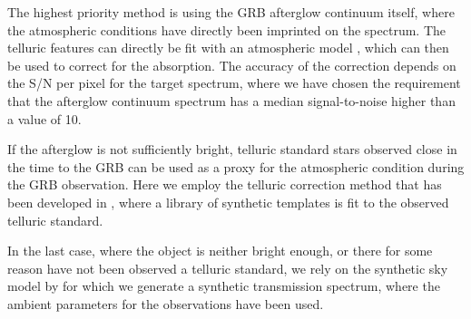 \documentclass{aa}    %
\begin{document}
The highest priority method is using the GRB afterglow continuum itself, where
the atmospheric conditions have directly been imprinted on the spectrum. The
telluric features can directly be fit with an atmospheric model
\citep{Smette2015, Kausch2015}, which can then be used to correct for the
absorption. The accuracy of the correction depends on the S/N per pixel for the
target spectrum, where we have chosen the requirement that the afterglow
continuum spectrum has a median signal-to-noise higher than a value of 10.

If the afterglow is not sufficiently bright, telluric standard stars observed
close in the time to the GRB can be used as a proxy for the atmospheric
condition during the GRB observation. Here we employ the telluric correction
method that has been developed in \citet{Selsing2015}, where a library of
synthetic templates is fit to the observed telluric standard.

In the last case, where the object is neither bright enough, or there for some
reason have not been observed a telluric standard, we rely on the synthetic sky
model by \citep{Noll2012, Jones2013} for which we generate a synthetic
transmission spectrum,  where the ambient parameters for the
observations have been used.
\end{document}
